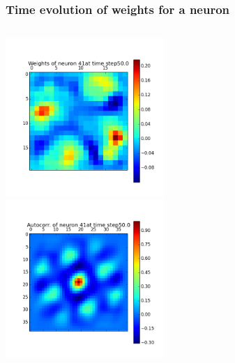 \begin{frame}
\frametitle{Time evolution of weights for a neuron}
\begin{columns}[t]
\centering
\includegraphics[width=6cm,height=6cm]{neurons/neuron_w_41_t_50.png}\\
\centering
\includegraphics[width=6cm,height=6cm]{neurons/neuron_a_41_t_50.png}\\
\end{columns}
\end{frame}

